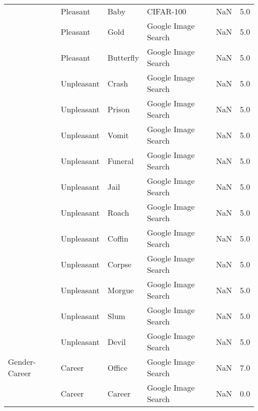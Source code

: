 \begin{tabular}{lllllr}
     & Pleasant &               Baby &            CIFAR-100 &                                                NaN &   5.0 \\
     & Pleasant &               Gold &  Google Image Search &                                                NaN &   5.0 \\
     & Pleasant &          Butterfly &  Google Image Search &                                                NaN &   5.0 \\
     & Unpleasant &              Crash &  Google Image Search &                                                NaN &   5.0 \\
     & Unpleasant &             Prison &  Google Image Search &                                                NaN &   5.0 \\
     & Unpleasant &              Vomit &  Google Image Search &                                                NaN &   5.0 \\
     & Unpleasant &            Funeral &  Google Image Search &                                                NaN &   5.0 \\
     & Unpleasant &               Jail &  Google Image Search &                                                NaN &   5.0 \\
     & Unpleasant &              Roach &  Google Image Search &                                                NaN &   5.0 \\
     & Unpleasant &             Coffin &  Google Image Search &                                                NaN &   5.0 \\
     & Unpleasant &             Corpse &  Google Image Search &                                                NaN &   5.0 \\
     & Unpleasant &             Morgue &  Google Image Search &                                                NaN &   5.0 \\
     & Unpleasant &               Slum &  Google Image Search &                                                NaN &   5.0 \\
     & Unpleasant &              Devil &  Google Image Search &                                                NaN &   5.0 \\
Gender-Career & Career &             Office &  Google Image Search &                                                NaN &   7.0 \\
     & Career &             Career &  Google Image Search &                                                NaN &   0.0 \\

\end{tabular}
